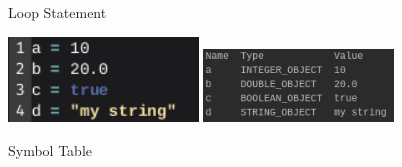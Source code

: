 \documentclass[
]{report}
\begin{document}
\begin{appendices}
\begin{figure}
		\caption{Loop Statement}
		\label{fig:loop-statement}
	\end{figure}
	\begin{figure}
		\centering
		\includegraphics[width=0.45\textwidth]{symbol-table-code}
		\includegraphics[width=0.45\textwidth]{symbol-table}
		\caption{Symbol Table}
		\label{fig:symbol-table}
	\end{figure}
	

\end{appendices}
\end{document}
